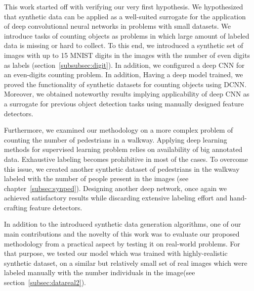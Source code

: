 This work started off with verifying our very first hypothesis. We hypothesized that synthetic data can be applied as a well-suited surrogate for the application of deep convolutional neural networks in problems with small datasets. We introduce tasks of counting objects as problems in which large amount of labeled data is missing or hard to collect. To this end, we introduced a synthetic set of images with up to 15 MNIST digits in the images with the number of even digits as labels (section~\ref{subsubsec:digit}). In addition, we configured a deep CNN for an even-digits counting problem. In addition, Having a deep model trained, we proved the functionality of synthetic datasets for counting objects using DCNN. Moreover, we obtained noteworthy results implying applicability of deep CNN as a surrogate for previous object detection tasks using manually designed feature detectors.


   

\indent Furthermore, we examined our methodology on a more complex problem of counting the number of pedestrians in a walkway. Applying deep learning methods for supervised learning problem relies on availability of big annotated data. Exhaustive labeling becomes prohibitive in most of the cases. To overcome this issue, we created another synthetic dataset of pedestrians in the walkway labeled with the number of people present in the images (see chapter~\ref{subsec:synped}). Designing another deep network, once again we achieved satisfactory results while discarding extensive labeling effort and hand-crafting feature detectors.   

\indent In addition to the introduced synthetic data generation algorithms, one of our main contributions and the novelty of this work was to evaluate our proposed methodology from a practical aspect by testing it on real-world problems. For that purpose, we tested our model which was trained with highly-realistic synthetic dataset, on a similar but relatively small set of real images which were labeled manually with the number individuals in the image(see section~\ref{subsec:datareal2}).    

